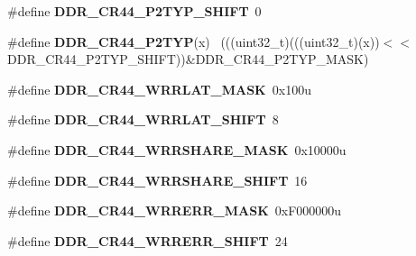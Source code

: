 \begin{DoxyCompactItemize}
\item 
\hypertarget{group___d_d_r___register___masks_gadb22eeca31f6386156391a3c65bc6dd4}{}\#define {\bfseries D\+D\+R\+\_\+\+C\+R44\+\_\+\+P2\+T\+Y\+P\+\_\+\+S\+H\+I\+F\+T}~0\label{group___d_d_r___register___masks_gadb22eeca31f6386156391a3c65bc6dd4}

\item 
\hypertarget{group___d_d_r___register___masks_gaec73c7e238ac84cc01b1b3b259121ed0}{}\#define {\bfseries D\+D\+R\+\_\+\+C\+R44\+\_\+\+P2\+T\+Y\+P}(x)                                            ~(((uint32\+\_\+t)(((uint32\+\_\+t)(x))$<$$<$D\+D\+R\+\_\+\+C\+R44\+\_\+\+P2\+T\+Y\+P\+\_\+\+S\+H\+I\+F\+T))\&D\+D\+R\+\_\+\+C\+R44\+\_\+\+P2\+T\+Y\+P\+\_\+\+M\+A\+S\+K)\label{group___d_d_r___register___masks_gaec73c7e238ac84cc01b1b3b259121ed0}

\item 
\hypertarget{group___d_d_r___register___masks_gab503821d0a61fd8c5df556a42d0d236b}{}\#define {\bfseries D\+D\+R\+\_\+\+C\+R44\+\_\+\+W\+R\+R\+L\+A\+T\+\_\+\+M\+A\+S\+K}~0x100u\label{group___d_d_r___register___masks_gab503821d0a61fd8c5df556a42d0d236b}

\item 
\hypertarget{group___d_d_r___register___masks_gabc9d98035e02a37208f20eada039067c}{}\#define {\bfseries D\+D\+R\+\_\+\+C\+R44\+\_\+\+W\+R\+R\+L\+A\+T\+\_\+\+S\+H\+I\+F\+T}~8\label{group___d_d_r___register___masks_gabc9d98035e02a37208f20eada039067c}

\item 
\hypertarget{group___d_d_r___register___masks_gaebdd5d5f5a9bc986682c213bef0fa974}{}\#define {\bfseries D\+D\+R\+\_\+\+C\+R44\+\_\+\+W\+R\+R\+S\+H\+A\+R\+E\+\_\+\+M\+A\+S\+K}~0x10000u\label{group___d_d_r___register___masks_gaebdd5d5f5a9bc986682c213bef0fa974}

\item 
\hypertarget{group___d_d_r___register___masks_ga56da26e7f08f1f87eb7adde440ceb912}{}\#define {\bfseries D\+D\+R\+\_\+\+C\+R44\+\_\+\+W\+R\+R\+S\+H\+A\+R\+E\+\_\+\+S\+H\+I\+F\+T}~16\label{group___d_d_r___register___masks_ga56da26e7f08f1f87eb7adde440ceb912}

\item 
\hypertarget{group___d_d_r___register___masks_ga0d684c9a07cec3bd001d1b7acfb5ac8f}{}\#define {\bfseries D\+D\+R\+\_\+\+C\+R44\+\_\+\+W\+R\+R\+E\+R\+R\+\_\+\+M\+A\+S\+K}~0x\+F000000u\label{group___d_d_r___register___masks_ga0d684c9a07cec3bd001d1b7acfb5ac8f}

\item 
\hypertarget{group___d_d_r___register___masks_gad22f37d4f2d794da136a28e3c4833097}{}\#define {\bfseries D\+D\+R\+\_\+\+C\+R44\+\_\+\+W\+R\+R\+E\+R\+R\+\_\+\+S\+H\+I\+F\+T}~24\label{group___d_d_r___register___masks_gad22f37d4f2d794da136a28e3c4833097}


\end{DoxyCompactItemize}
